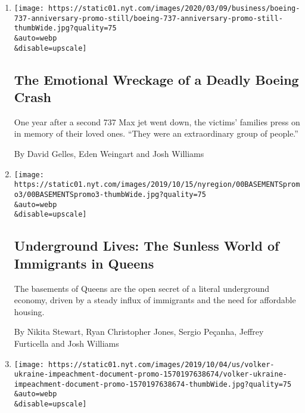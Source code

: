 \begin{enumerate}
\def\labelenumi{\arabic{enumi}.}
\item
  \href{/interactive/2020/03/09/business/boeing-737-crash-anniversary.html}{}

  \texttt{[image: https://static01.nyt.com/images/2020/03/09/business/boeing-737-anniversary-promo-still/boeing-737-anniversary-promo-still-thumbWide.jpg?quality=75\\\&auto=webp\\\&disable=upscale]}

  \hypertarget{the-emotional-wreckage-of-a-deadly-boeing-crash}{%
  \subsection{The Emotional Wreckage of a Deadly Boeing
  Crash}\label{the-emotional-wreckage-of-a-deadly-boeing-crash}}

  One year after a second 737 Max jet went down, the victims' families
  press on in memory of their loved ones. ``They were an extraordinary
  group of people.''

  By David Gelles, Eden Weingart and Josh Williams
\item
  \href{/interactive/2019/10/23/nyregion/basements-queens-immigrants.html}{}

  \texttt{[image: https://static01.nyt.com/images/2019/10/15/nyregion/00BASEMENTSpromo3/00BASEMENTSpromo3-thumbWide.jpg?quality=75\\\&auto=webp\\\&disable=upscale]}

  \hypertarget{underground-lives-the-sunless-world-of-immigrants-in-queens}{%
  \subsection{Underground Lives: The Sunless World of Immigrants in
  Queens}\label{underground-lives-the-sunless-world-of-immigrants-in-queens}}

  The basements of Queens are the open secret of a literal underground
  economy, driven by a steady influx of immigrants and the need for
  affordable housing.

  By Nikita Stewart, Ryan Christopher Jones, Sergio Peçanha, Jeffrey
  Furticella and Josh Williams
\item
  \href{/interactive/2019/10/04/us/politics/ukraine-text-messages-volker.html}{}

  \texttt{[image: https://static01.nyt.com/images/2019/10/04/us/volker-ukraine-impeachment-document-promo-1570197638674/volker-ukraine-impeachment-document-promo-1570197638674-thumbWide.jpg?quality=75\\\&auto=webp\\\&disable=upscale]}


\end{enumerate}
